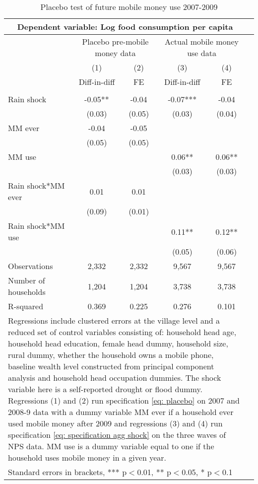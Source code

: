 \begin{table}
\centering
\caption{Placebo test of future mobile money use 2007-2009} \label{placebo}

\begin{tabular}{lccccc} \multicolumn{5}{c}{Dependent variable: Log food consumption per capita} \\\hline
& \multicolumn{2}{c}{Placebo pre-mobile money data} & \multicolumn{2}{c}{Actual mobile money use data} \\ \cmidrule(r){2-3} \cmidrule(l){4-5}
 & (1) & (2) & (3) & (4) \\
 & Diff-in-diff & FE & Diff-in-diff  & FE \\ \hline
 &  &  &  &  &  \\
Rain shock &-0.05** & -0.04 & -0.07***  & -0.04 \\
 & (0.03) & (0.05) & (0.03)  & (0.04) \\
 MM ever & -0.04 & -0.05 &    &  \\
 & (0.05) & (0.05) &  &  &  \\
MM use &  &  & 0.06** & 0.06** \\
 &  &  & (0.03) & (0.03) \\
 
Rain shock*MM ever & 0.01 & 0.01 &  &  \\
 & (0.09) & (0.01) &  &  \\

Rain shock*MM use &  &  & 0.11**  & 0.12** \\
 &  &  & (0.05) & (0.06) \\
Observations & 2,332 & 2,332 & 9,567  & 9,567 \\
Number of households & 1,204 & 1,204 & 3,738 & 3,738 \\
R-squared & 0.369 & 0.225 & 0.276  & 0.101 \\
  \hline
\multicolumn{5}{p{14cm}}{Regressions include clustered errors at the village level and a reduced set of control variables consisting of: household head age, household head education, female head dummy, household size, rural dummy, whether the household owns a mobile phone, baseline wealth level constructed from principal component analysis and household head occupation dummies. The shock variable here is a self-reported drought or flood dummy. Regressions (1) and (2) run specification \eqref{eq: placebo} on 2007 and 2008-9 data with a dummy variable MM ever if a household ever used mobile money after 2009 and regressions (3) and (4) run specification \eqref{eq: specification agg shock} on the three waves of NPS data. MM use is a dummy variable equal to one if the household uses mobile money in a given year.} \\
\multicolumn{5}{l}{ Standard errors in brackets, *** p$<$0.01, ** p$<$0.05, * p$<$0.1} \\
\end{tabular}
\end{table}